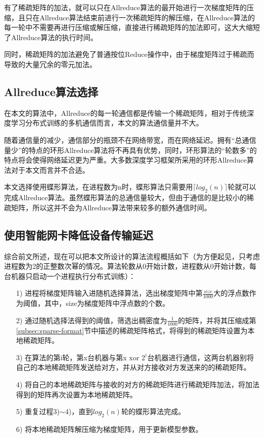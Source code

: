 有了稀疏矩阵的加法，就可以只在Allreduce算法的最开始进行一次梯度矩阵的压缩，且只在Allreduce算法结束前进行一次稀疏矩阵的解压缩，在Allreduce算法的每一轮中不需要再进行压缩或解压缩，直接进行稀疏矩阵的加法即可，这大大缩短了Allreduce算法的执行时间。

同时，稀疏矩阵的加法避免了普通按位Reduce操作中，由于梯度矩阵过于稀疏而导致的大量冗余的零元加法。

\subsection{Allreduce算法选择}
在本文的算法中，Allreduce的每一轮通信都是传输一个稀疏矩阵，相对于传统深度学习分布式训练的多机通信而言，本文的算法通信量并不大。

随着通信量的减少，通信部分的瓶颈不在网络带宽，而在网络延迟。拥有“总通信量少”的特点的环形Allreduce算法将不再具有优势，同时，环形算法的“轮数多”的特点将会使得网络延迟更为严重。大多数深度学习框架所采用的环形Allreduce算法对于本文而言并不合适。

本文选择使用蝶形算法，在进程数为n时，蝶形算法只需要用$\lceil log_2(n) \rceil$轮就可以完成Allreduce算法。虽然蝶形算法的总通信量较大，但由于通信的是比较小的稀疏矩阵，所以这并不会为Allreduce算法带来较多的额外通信时间。

\subsection{使用智能网卡降低设备传输延迟}
综合前文所述，现在可以把本文所设计的算法流程概括如下（为方便起见，只考虑进程数为2的正整数次幂的情况。算法轮数从0开始计数，进程数从0开始计数，每台机器只启动一个进程执行分布式训练）：
\begin{itemize}
  \item [1)]
  进程将梯度矩阵输入进随机选择算法，选出梯度矩阵中第$\frac{size}{1000}$大的浮点数作为阈值，其中，size为梯度矩阵中浮点数的个数。
  \item [2)] 
  通过随机选择法得到的阈值，筛选出稠密度为$\frac{1}{1000}$的矩阵，并将其压缩成第\ref{subsec:sparse-format}节中描述的稀疏矩阵格式，将得到的稀疏矩阵设置为本地稀疏矩阵。
  \item [3)]
  在算法的第i轮，第x台机器与第x xor $2^i$台机器进行通信，这两台机器别将自己的本地稀疏矩阵发送给对方，并从对方接收对方发送来的的稀疏矩阵。
  \item [4)]
  将自己的本地稀疏矩阵与接收的对方的稀疏矩阵进行稀疏矩阵加法，将加法得到的矩阵再次设置为本地稀疏矩阵。
  \item [5)]
  重复过程3)$\sim$4)，直到$log_2(n)$轮的蝶形算法完成。
  \item [6)]
  将本地稀疏矩阵解压缩为梯度矩阵，用于更新模型参数。
\end{itemize}

